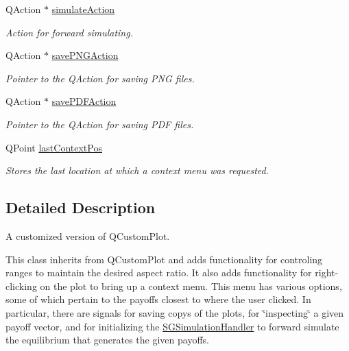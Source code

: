 \begin{DoxyCompactItemize}
\mbox{\label{classSGCustomPlot_aa33a8ed74cad0d2e0ef1b1d4e2af6a31}} 
Q\+Action $\ast$ \hyperlink{classSGCustomPlot_aa33a8ed74cad0d2e0ef1b1d4e2af6a31}{simulate\+Action}
\begin{DoxyCompactList}\small\item\em Action for forward simulating. \end{DoxyCompactList}\item 
\mbox{\label{classSGCustomPlot_ac20df7cd696ea2b61c78606589f5e726}} 
Q\+Action $\ast$ \hyperlink{classSGCustomPlot_ac20df7cd696ea2b61c78606589f5e726}{save\+P\+N\+G\+Action}
\begin{DoxyCompactList}\small\item\em Pointer to the Q\+Action for saving P\+NG files. \end{DoxyCompactList}\item 
\mbox{\label{classSGCustomPlot_a9df5c584b4b967e80d3a56b0e2f7fef1}} 
Q\+Action $\ast$ \hyperlink{classSGCustomPlot_a9df5c584b4b967e80d3a56b0e2f7fef1}{save\+P\+D\+F\+Action}
\begin{DoxyCompactList}\small\item\em Pointer to the Q\+Action for saving P\+DF files. \end{DoxyCompactList}\item 
\mbox{\label{classSGCustomPlot_ac3903a96504ec5d4e4a5c76e1fe602c7}} 
Q\+Point \hyperlink{classSGCustomPlot_ac3903a96504ec5d4e4a5c76e1fe602c7}{last\+Context\+Pos}
\begin{DoxyCompactList}\small\item\em Stores the last location at which a context menu was requested. \end{DoxyCompactList}\end{DoxyCompactItemize}


\subsection{Detailed Description}
A customized version of Q\+Custom\+Plot. 

This class inherits from Q\+Custom\+Plot and adds functionality for controling ranges to maintain the desired aspect ratio. It also adds functionality for right-\/clicking on the plot to bring up a context menu. This menu has various options, some of which pertain to the payoffs closest to where the user clicked. In particular, there are signals for saving copys of the plots, for \char`\"{}inspecting\char`\"{} a given payoff vector, and for initializing the \hyperlink{classSGSimulationHandler}{S\+G\+Simulation\+Handler} to forward simulate the equilibrium that generates the given payoffs. 

